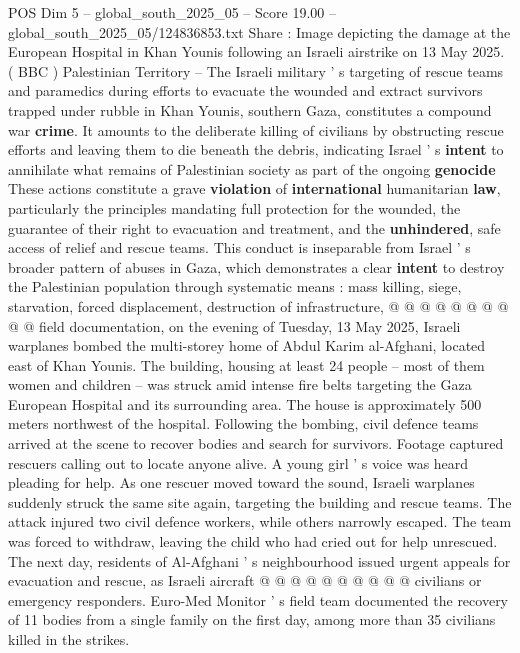 \begin{textsample}{POS Dim 5 – global\_south\_2025\_05 – Score 19.00 – global\_south\_2025\_05/124836853.txt}  \label{ex:f5_pos_191}
Share : Image depicting the damage at the European Hospital in Khan Younis following an Israeli airstrike on 13 May 2025. ( BBC ) Palestinian Territory -- The Israeli military ' s targeting of rescue teams and paramedics during efforts to evacuate the wounded and extract survivors trapped under rubble in Khan Younis, southern Gaza, constitutes a compound war \textbf{crime}.
It amounts to the deliberate killing of civilians by obstructing rescue efforts and leaving them to die beneath the debris, indicating Israel ' s \textbf{intent} to annihilate what remains of Palestinian society as part of the ongoing \textbf{genocide} These actions constitute a grave \textbf{violation} of \textbf{international} humanitarian \textbf{law}, particularly the principles mandating full protection for the wounded, the guarantee of their right to evacuation and treatment, and the \textbf{unhindered}, safe access of relief and rescue teams.
This conduct is inseparable from Israel ' s broader pattern of abuses in Gaza, which demonstrates a clear \textbf{intent} to destroy the Palestinian population through systematic means : mass killing, siege, starvation, forced displacement, destruction of infrastructure, @ @ @ @ @ @ @ @ @ @ field documentation, on the evening of Tuesday, 13 May 2025, Israeli warplanes bombed the multi-storey home of Abdul Karim al-Afghani, located east of Khan Younis.
The building, housing at least 24 people -- most of them women and children -- was struck amid intense fire belts targeting the Gaza European Hospital and its surrounding area.
The house is approximately 500 meters northwest of the hospital.
Following the bombing, civil defence teams arrived at the scene to recover bodies and search for survivors.
Footage captured rescuers calling out to locate anyone alive.
A young girl ' s voice was heard pleading for help.
As one rescuer moved toward the sound, Israeli warplanes suddenly struck the same site again, targeting the building and rescue teams.
The attack injured two civil defence workers, while others narrowly escaped.
The team was forced to withdraw, leaving the child who had cried out for help unrescued.
The next day, residents of Al-Afghani ' s neighbourhood issued urgent appeals for evacuation and rescue, as Israeli aircraft @ @ @ @ @ @ @ @ @ @ civilians or emergency responders.
Euro-Med Monitor ' s field team documented the recovery of 11 bodies from a single family on the first day, among more than 35 civilians killed in the strikes.

\end{textsample}
